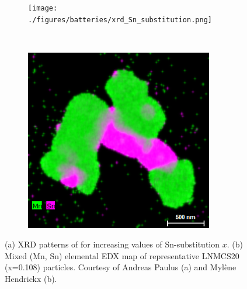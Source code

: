 \begin{refsection}
\begin{figure}[h]
    \centering
    \begin{subfigure}[t]{0.65\textwidth}
        \centering
        \texttt{[image: ./figures/batteries/xrd\_Sn\_substitution.png]}
       \caption{}
    \end{subfigure}%
    ~ 
    \begin{subfigure}[t]{0.34\textwidth}
        \centering
        \includegraphics[width=0.9\textwidth]{./figures/batteries/edx_Sn_substitution.png}
        \caption{}
    \end{subfigure}
    \caption{(a) XRD patterns of  for increasing values of Sn-substitution $x$. (b) Mixed (Mn, Sn) elemental EDX map of representative LNMCS20 (x=0.108) particles. Courtesy of Andreas Paulus (a) and Myl\`ene Hendrickx (b).}
    \label{batteries:fig-Sn_experiment}
\end{figure}


\end{refsection}
